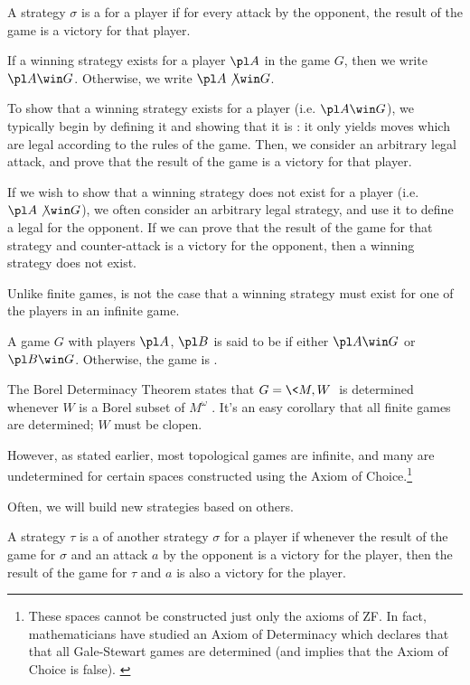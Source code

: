 \begin{defn}
  A strategy $\sigma$ is a  for a player if for
  every attack by the opponent, the result of the game is a victory
  for that player.

  If a winning strategy exists for a player $\pl A$ in the game $G$, then we
  write $\pl A \win G$. Otherwise, we write $\pl A \not\win G$.
\end{defn}

To show that a winning strategy exists for a player (i.e. $\pl A\win G$),
we typically begin by
defining it and showing that it is : it only yields moves which are
legal according to the rules of the game. Then, we consider an arbitrary
legal attack, and prove that the result of the game is a victory for that
player.

If we wish to show that a winning strategy does not exist for a player
(i.e. $\pl A\not\win G$), we
often consider an arbitrary legal strategy, and use it to define a legal
 for the opponent. If we can prove that the result of
the game for that strategy and counter-attack is a victory for the opponent,
then a winning strategy does not exist.

Unlike finite games, is not the case that a winning strategy must exist for
one of the players in an infinite game.

\begin{defn}
  A game $G$ with players $\pl A$, $\pl B$ is said to be 
  if either $\pl A \win G$ or $\pl B \win G$.
  Otherwise, the game is .
\end{defn}

The Borel Determinacy Theorem states that $G=\<M,W\>$ is determined whenever
$W$ is a Borel subset of $M^\omega$ \cite{MR0403976}. It's an easy corollary that
all finite games are determined; $W$ must be clopen.

However, as stated earlier, most topological games are infinite,
and many are undetermined for certain spaces constructed using the Axiom of
Choice.\footnote{
  These spaces cannot be constructed just only the axioms of ZF. In fact,
  mathematicians have studied an Axiom of Determinacy which declares that
  that all Gale-Stewart games are determined (and implies that the Axiom
  of Choice is false). \cite{MR0140430}
}

Often, we will build new strategies based on others.

\begin{defn}
  A strategy $\tau$ is a  of another strategy $\sigma$
  for a player if whenever the result of the game for $\sigma$ and an attack
  $a$ by the opponent is a victory for the player, then the result of the game
  for $\tau$ and $a$ is also a victory for the player.
\end{defn}

